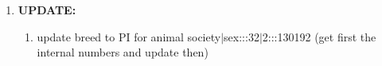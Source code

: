 \documentclass[10pt,a4paper,DIV14]{scrartcl}
\begin{document}
\begin{enumerate}
\item {\bf UPDATE:}
\begin{enumerate}
\item update breed to PI for animal society$|$sex:::32$|$2:::130192 (get
  first the internal numbers and update then)
\end{enumerate}
\end{enumerate}


\end{document}
